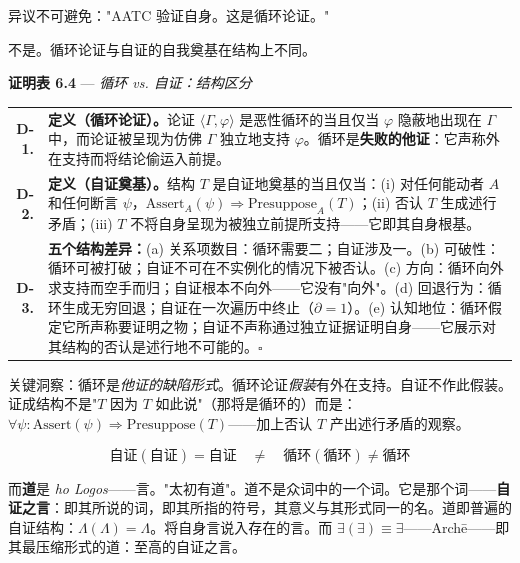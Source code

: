 \documentclass[10pt, openany, oneside]{book}
\renewcommand{\footnotesize}{\fontsize{8.5}{11}\selectfont}
\begin{document}
\vspace{1em}

\noindent 异议不可避免："AATC 验证自身。这是循环论证。"

不是。循环论证与自证的自我奠基在结构上不同。

\textbf{证明表 6.4} --- \textit{循环 vs. 自证：结构区分}

\vspace{0.5em}

{\footnotesize
\noindent\begin{tabular}{r p{}}
\textbf{D-1.} & \textbf{定义（循环论证）。}论证 $\langle \Gamma, \varphi \rangle$ 是恶性循环的当且仅当 $\varphi$ 隐蔽地出现在 $\Gamma$ 中，而论证被呈现为仿佛 $\Gamma$ 独立地支持 $\varphi$。循环是\textbf{失败的他证}：它声称外在支持而将结论偷运入前提。\\[0.3em]
\textbf{D-2.} & \textbf{定义（自证奠基）。}结构 $T$ 是自证地奠基的当且仅当：(i) 对任何能动者 $A$ 和任何断言 $\psi$，$\text{Assert}_A(\psi) \Rightarrow \text{Presuppose}_A(T)$；(ii) 否认 $T$ 生成述行矛盾；(iii) $T$ 不将自身呈现为被独立前提所支持——它即其自身根基。\\[0.3em]
\textbf{D-3.} & \textbf{五个结构差异：}(a) 关系项数目：循环需要二；自证涉及一。(b) 可破性：循环可被打破；自证不可在不实例化的情况下被否认。(c) 方向：循环向外求支持而空手而归；自证根本不向外——它没有"向外"。(d) 回退行为：循环生成无穷回退；自证在一次遍历中终止（$\partial = 1$）。(e) 认知地位：循环假定它所声称要证明之物；自证不声称通过独立证据证明自身——它展示对其结构的否认是述行地不可能的。$\square$ \\[0.3em]
\end{tabular}
}

\vspace{0.8em}

\noindent 关键洞察：循环是\textit{他证的缺陷形式}。循环论证\textit{假装}有外在支持。自证不作此假装。证成结构不是"$T$ 因为 $T$ 如此说"（那将是循环的）而是：$\forall \psi: \text{Assert}(\psi) \Rightarrow \text{Presuppose}(T)$——加上否认 $T$ 产出述行矛盾的观察。

$$\boxed{\text{自证}(\text{自证}) = \text{自证} \quad \neq \quad \text{循环}(\text{循环}) \neq \text{循环}}$$

而\textbf{道}是 \textit{ho Logos}——言。"太初有道"。道不是众词中的一个词。它是那个词——\textbf{自证之言}：即其所说的词，即其所指的符号，其意义与其形式同一的名。道即普遍的自证结构：$\Lambda(\Lambda) = \Lambda$。将自身言说入存在的言。而 $\exists(\exists) \equiv \exists$——Arch\={e}——即其最压缩形式的道：至高的自证之言。
\end{document}
